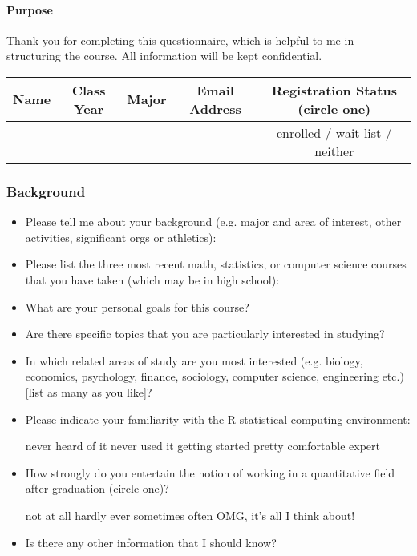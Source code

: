 \documentclass[10pt]{article}
\begin{document}

\paragraph*{Purpose}
Thank you for completing this questionnaire, which is helpful to me in structuring the course.  All information will be kept confidential.

\begin{center}
\begin{tabular}{|c|c|c|c|c|}
  \hline
	Name & Class Year & Major & Email Address & Registration Status (circle one) \\
	\hline
	\hspace{1in} & \hspace{0.5in} & \hspace{0.5in} & \hspace{1.5in} & enrolled / wait list / neither \\[2ex]
	\hline
\end{tabular}
\end{center}

\subsubsection*{Background}
\begin{itemize}
	\itemsep1.5cm
	\item Please tell me about your background (e.g. major and area of interest, other activities, significant orgs or athletics):
	\item Please list the three most recent math, statistics, or computer science courses that you have taken (which may be in high school):
	\item What are your personal goals for this course?
	\item Are there specific topics that you are particularly interested in studying?
	\item In which related areas of study are you most interested (e.g. biology, economics, psychology, finance, sociology, computer science, engineering etc.) [list as many as you like]?
	\item Please indicate your familiarity with the \textsf{R} statistical computing environment:
	\begin{center}
		never heard of it \qquad never used it \qquad getting started \qquad pretty comfortable \qquad expert
	\end{center}
	\itemsep0.5cm
	\item How strongly do you entertain the notion of working in a quantitative field after graduation (circle one)?
	\begin{center}
		not at all \qquad hardly ever \qquad sometimes \qquad often \qquad OMG, it's all I think about!
	\end{center}
	\item Is there any other information that I should know?
\end{itemize}
\end{document}
